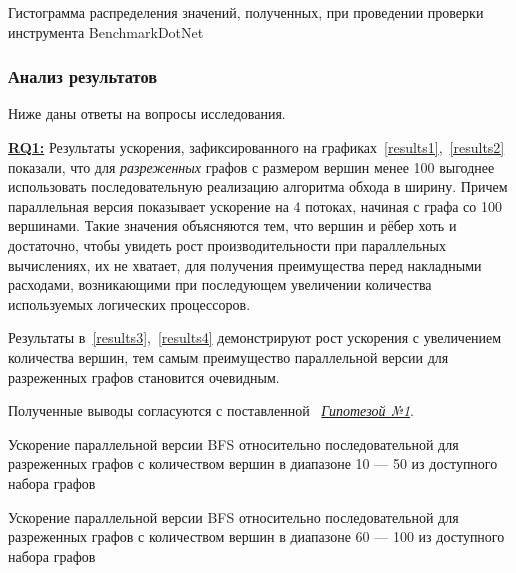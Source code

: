 \begin{table}[ht]
  \centering

\caption{Гистограмма распределения значений, полученных, при проведении проверки инструмента BenchmarkDotNet}
\label{histogram}
\end{table}


\subsubsection*{Анализ результатов}
\noindent Ниже даны ответы на вопросы исследования.
\newline

\noindent\hyperref[rq1]{\textbf{RQ1:}}
Результаты ускорения, зафиксированного на графиках~\ref{results1},~\ref{results2} показали, что для \emph{разреженных} графов с размером вершин менее 100 выгоднее использовать последовательную реализацию алгоритма обхода в ширину. Причем параллельная версия показывает ускорение на 4 потоках, начиная с графа со 100 вершинами. Такие значения объясняются тем, что вершин и рёбер хоть и достаточно, чтобы увидеть рост производительности при параллельных вычислениях, их не хватает, для получения преимущества перед накладными расходами, возникающими при последующем увеличении количества используемых логических процессоров. 

Результаты в~\ref{results3},~\ref{results4} демонстрируют рост ускорения с увеличением количества вершин, тем самым преимущество параллельной версии для разреженных графов становится очевидным.

Полученные выводы согласуются с поставленной ~\hyperref[t1]{\textit{Гипотезой №1}}.
\newline

\begin{table}
  \centering

\caption{Ускорение параллельной версии BFS относительно последовательной для разреженных графов с количеством вершин в диапазоне 10 --- 50 из доступного набора графов}
\label{results1}
\end{table}

\begin{table}
  \centering

\caption{Ускорение параллельной версии BFS относительно последовательной для разреженных графов с количеством вершин в диапазоне 60 --- 100 из доступного набора графов}
\label{results2}
\end{table}

